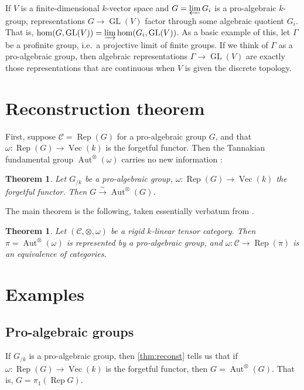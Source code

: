 \documentclass{article}
\DeclareMathOperator{\aut}{Aut}
\DeclareMathOperator{\GL}{GL}
\DeclareMathOperator{\rep}{Rep}
\DeclareMathOperator{\vect}{Vec}
\newcommand{\cC}{\mathcal{C}}
\newcommand{\iso}{\xrightarrow\sim}
\newtheorem{theorem}[subsection]{Theorem}
\begin{document}
If $V$ is a finite-dimensional $k$-vector space and $G=\varprojlim G_i$ is a 
pro-algebraic $k$-group, representations $G\to \GL(V)$ factor through some 
algebraic quotient $G_i$. That is, 
$\hom(G,\GL(V))=\varinjlim \hom(G_i,\GL(V))$. As a basic example of this, 
let $\Gamma$ be a profinite group, i.e.~a projective limit of finite groups. If 
we think of $\Gamma$ as a pro-algebraic group, then algebraic representations 
$\Gamma\to \GL(V)$ are exactly those representations that are continuous when 
$V$ is given the discrete topology. 





\section{Reconstruction theorem}

First, suppose $\cC=\rep(G)$ for a pro-algebraic group $G$, and that 
$\omega:\rep(G)\to \vect(k)$ is the forgetful functor. Then the Tannakian 
fundamental group $\aut^\otimes(\omega)$ carries no new information 
\cite[Pr.~2.8]{deligne-milne-1982}: 

\begin{theorem}\label{thm:reconst}
Let $G_{/k}$ be a pro-algebraic group, $\omega:\rep(G)\to \vect(k)$ the 
forgetful functor. Then $G\iso \aut^\otimes(G)$. 
\end{theorem}

The main theorem is the following, taken essentially verbatum from 
\cite[Th.~2.11]{deligne-milne-1982}. 

\begin{theorem}\label{thm:main}
Let $(\cC,\otimes,\omega)$ be a rigid $k$-linear tensor category. Then 
$\pi=\aut^\otimes(\omega)$ is represented by a pro-algebraic group, and 
$\omega:\cC\to \rep(\pi)$ is an equivalence of categories. 
\end{theorem}





\section{Examples}


\subsection{Pro-algebraic groups}

If $G_{/k}$ is a pro-algebraic group, then \autoref{thm:reconst} tells us that if 
$\omega:\rep(G)\to \vect(k)$ is the forgetful functor, then 
$G=\aut^\otimes(G)$. That is, $G=\pi_1(\rep G)$. 
\end{document}

